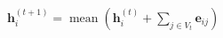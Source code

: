 $\mathbf{h}_i^{(t+1)}=\operatorname{mean}\left(\mathbf{h}_i^{(t)}+\sum_{j\in V_t}\mathbf{e}_{ij}\right)$
